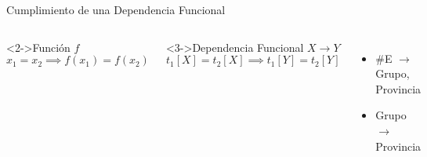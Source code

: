 \begin{frame}{Cumplimiento de una Dependencia Funcional}
    \begin{columns} 
        \begin{block}<2->{Funci\'on $f$}
            $$
            x_1 = x_2 \implies f(x_1) = f(x_2)
            $$
        \end{block}
        \begin{block}<3->{Dependencia Funcional $X \to Y$}
            $$
            t_1[X] = t_2[X] \implies t_1[Y] = t_2[Y] 
            $$
        \end{block}

        \centering
        \vspace{5mm}

        \begin{itemize}
            \item<5-> \#E $\to$ Grupo, Provincia
            \item<6-> Grupo $\to$ Provincia
        \end{itemize}
        \vspace{5mm}

    \end{columns}


\end{frame}


